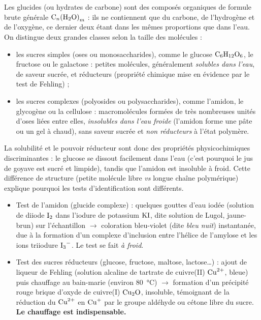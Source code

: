 \documentclass[11pt]{article}
\newcommand{\cle}[1]{{\popxbold\color{popdark}#1}}
\begin{document}
\begin{definition}[Glucides]
Les \cle{glucides} (ou hydrates de carbone) sont des composés organiques de formule brute générale $\ce{C}_{n}\ce{(H2O)}_{m}$ : ils ne contiennent que du carbone, de l'hydrogène et de l'oxygène, ce dernier deux étant dans les mêmes proportions que dans l'eau. On distingue deux grandes classes selon la taille des molécules :
\begin{itemize}
\item les \cle{sucres simples} (oses ou monosaccharides), comme le \cle{glucose} $\ce{C6H12O6}$, le fructose ou le galactose : petites molécules, généralement \emph{solubles dans l'eau}, de saveur sucrée, et \cle{réducteurs} (propriété chimique mise en évidence par le test de Fehling) ;
\item les \cle{sucres complexes} (polyosides ou polysaccharides), comme l'\cle{amidon}, le glycogène ou la cellulose : macromolécules formées de très nombreuses unités d'oses liées entre elles, \emph{insolubles dans l'eau froide} (l'amidon forme une pâte ou un gel à chaud), sans saveur sucrée et \emph{non réducteurs} à l'état polymère.
\end{itemize}
\end{definition}

La \cle{solubilité} et le \cle{pouvoir réducteur} sont donc des propriétés physicochimiques discriminantes : le glucose se dissout facilement dans l'eau (c'est pourquoi le jus de goyave est sucré et limpide), tandis que l'amidon est insoluble à froid. Cette différence de structure (petite molécule libre \emph{vs} longue chaîne polymérique) explique pourquoi les tests d'identification sont différents.

\begin{propriete}
\begin{itemize}
\item \cle{Test de l'amidon (glucide complexe)} : quelques gouttes d'\cle{eau iodée} (solution de diiode $\ce{I2}$ dans l'iodure de potassium $\ce{KI}$, dite solution de Lugol, jaune-brun) sur l'échantillon $\rightarrow$ coloration \cle{bleu-violet} (dite \emph{bleu nuit}) instantanée, due à la formation d'un complexe d'inclusion entre l'hélice de l'amylose et les ions triiodure $\ce{I3-}$. Le test se fait \emph{à froid}.
\item \cle{Test des sucres réducteurs} (glucose, fructose, maltose, lactose\ldots) : ajout de \cle{liqueur de Fehling} (solution alcaline de tartrate de cuivre(II) $\ce{Cu^2+}$, bleue) puis \cle{chauffage} au bain-marie (environ \SI{80}{\celsius}) $\rightarrow$ formation d'un \cle{précipité rouge brique} d'oxyde de cuivre(I) $\ce{Cu2O}$, insoluble, témoignant de la réduction du $\ce{Cu^2+}$ en $\ce{Cu+}$ par le groupe aldéhyde ou cétone libre du sucre. \textbf{Le chauffage est indispensable.}
\end{itemize}
\end{propriete}
\end{document}
